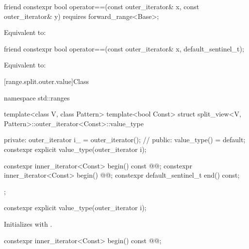 \documentclass{wg21}
\begin{document}
%
\begin{itemdecl}
friend constexpr bool operator==(const outer_iterator& x, const outer_iterator& y)
requires forward_range<Base>;
\end{itemdecl}

\begin{itemdescr}
\pnum
\effects Equivalent to: 
\end{itemdescr}

%
\begin{itemdecl}
friend constexpr bool operator==(const outer_iterator& x, default_sentinel_t);
\end{itemdecl}

\begin{itemdescr}
\pnum
\effects
Equivalent to: 
\end{itemdescr}

[range.split.outer.value]{Class }

\begin{codeblock}
namespace std::ranges {
	template<class V, class Pattern>
	template<bool Const>
	struct split_view<V, Pattern>::outer_iterator<Const>::value_type {
		private:
		outer_iterator i_ = outer_iterator();               // \expos
		public:
		value_type() = default;
		constexpr explicit value_type(outer_iterator i);
		
		constexpr inner_iterator<Const> begin() const @@;
		constexpr inner_iterator<Const> begin() @@;
		constexpr default_sentinel_t end() const;
	};
}
\end{codeblock}

%
\begin{itemdecl}
constexpr explicit value_type(outer_iterator i);
\end{itemdecl}

\begin{itemdescr}
\pnum
\effects Initializes  with .
\end{itemdescr}

%
\begin{itemdecl}
constexpr inner_iterator<Const> begin() const @@;
\end{itemdecl}
\end{document}
